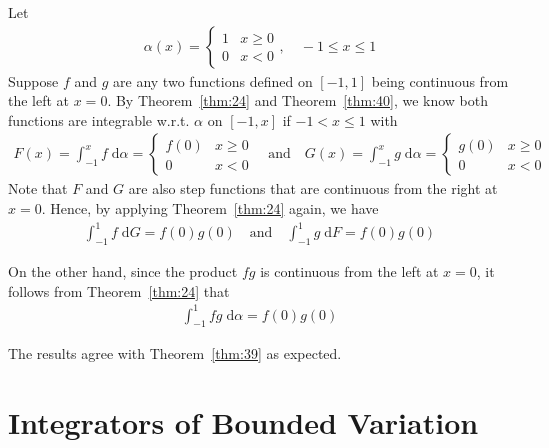 \documentclass[thmcnt=section, 12pt]{my-elegantbook}
\begin{document}
\begin{example}
    Let
    \begin{align*}
        \alpha(x)
        = \begin{cases}
            1 &x \geq 0 \\ 
            0 &x < 0
        \end{cases},
        \quad
        -1 \leq x \leq 1
    \end{align*}
    Suppose $f$ and $g$ are any two functions defined on $[-1, 1]$ being continuous from the left at $x=0$. By Theorem~\ref{thm:24} and Theorem~\ref{thm:40}, we know both functions are integrable w.r.t. $\alpha$ on $[-1, x]$ if $-1 < x \leq 1$ with 
    \begin{align*}
        F(x) = \int_{-1}^x f \; \mathrm{d}\alpha = \begin{cases}
            f(0) &x \geq 0 \\ 
            0 &x < 0
        \end{cases}
        \quad \text{and} \quad 
        G(x) = \int_{-1}^x g \; \mathrm{d}\alpha = \begin{cases}
            g(0) &x \geq 0 \\ 
            0 &x < 0
        \end{cases}
    \end{align*}
    Note that $F$ and $G$ are also step functions that are continuous from the right at $x = 0$. Hence, by applying Theorem~\ref{thm:24} again, we have 
    \begin{align*}
        \int_{-1}^{1} f \; \mathrm{d}G = f(0)g(0)
        \quad \text{and} \quad 
        \int_{-1}^{1} g \; \mathrm{d}F = f(0)g(0)
    \end{align*}

    On the other hand, since the product $f g$ is continuous from the left at $x=0$, it follows from Theorem~\ref{thm:24} that \begin{align*}
        \int_{-1}^{1} f g \; \mathrm{d}\alpha
        = f(0)g(0)
    \end{align*}

    The results agree with Theorem~\ref{thm:39} as expected.
\end{example}


\section{Integrators of Bounded Variation}
\label{sec:1}
\end{document}
